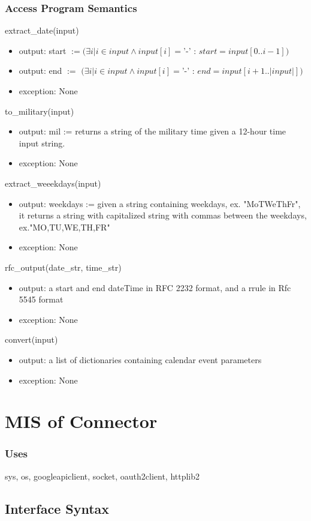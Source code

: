 \documentclass[12pt, titlepage]{article}
\begin{document}
\subsubsection{Access Program Semantics}
extract\_date(input)
\begin{itemize}
    \item output: start $:= (\exists i | i \in input \land input[i] = $'-' : $ start = input[0..i-1]) $ 
    \item output: end $:= $
    $(\exists i | i \in input \land input[i] = $'-' : $ end = input[i+1..|input|]) $
    \item exception: None
\end{itemize}
to\_military(input)
\begin{itemize}
    \item output: mil := returns a string of  the military time given a 12-hour time input string.
    \item exception: None
\end{itemize}
extract\_weeekdays(input)
\begin{itemize}
    \item output: weekdays := given a string containing weekdays, ex. "MoTWeThFr", it returns a string with capitalized string with commas between the weekdays, ex."MO,TU,WE,TH,FR" 
    \item exception: None
\end{itemize}
rfc\_output(date\_str, time\_str)
\begin{itemize}
    \item output: a start and end dateTime in RFC 2232 format, and a rrule in Rfc 5545 format
    \item exception: None
\end{itemize}
convert(input)
\begin{itemize}
    \item output: a list of dictionaries containing calendar event parameters
    \item exception: None
\end{itemize}

\newpage
\section{MIS of Connector} \label{SecM4}
\subsubsection{Uses}
sys, os, googleapiclient, socket, oauth2client, httplib2
\subsection{Interface Syntax}
\end{document}
